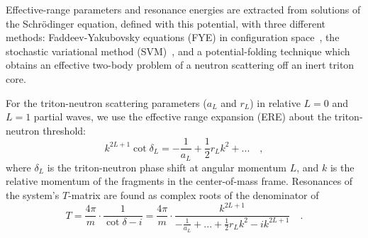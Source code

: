 \documentclass[5p,times]{elsarticle}
\begin{document}
Effective-range parameters and resonance energies are extracted from solutions of the Schr\"odinger equation, defined with
this potential, with three different methods:
Faddeev-Yakubovsky equations (FYE) in configuration space~\cite{Lazauskas:2004hq, Lazauskas:2019hil}, the stochastic variational method
 (SVM)~\cite{Suzuki:1998bn}, and a potential-folding technique which obtains an effective two-body problem of a neutron scattering off
 an inert triton core.

For the triton-neutron scattering parameters ($a_L$ and $r_L$) in relative $L=0$ and $L=1$ partial waves, we use
the effective range expansion (ERE) about the triton-neutron threshold:
%
\begin{equation}
    k^{2L+1}\cot\delta_L=-\frac{1}{a_L}+\frac{1}{2}r_L k^2 + ... 
    \quad ,
    \label{eq.app.ere}
\end{equation}
%
where $\delta_L$ is the triton-neutron phase shift at angular momentum $L$, and $k$ is the relative momentum of the fragments in the center-of-mass frame. 
Resonances of the system's $T$-matrix are found as complex roots of the denominator of
%
\begin{equation}
T =\frac{4\pi}{m}\cdot\frac{1}{\cot\delta-i} =
\frac{4\pi}{m}\cdot\frac{k^{2L+1}}{-\frac{1}{a_L}+...+\frac{1}{2}r_L k^2
-ik^{2L+1}}
\quad.
\label{eq:Tmatrix}
\end{equation}
%
\end{document}
